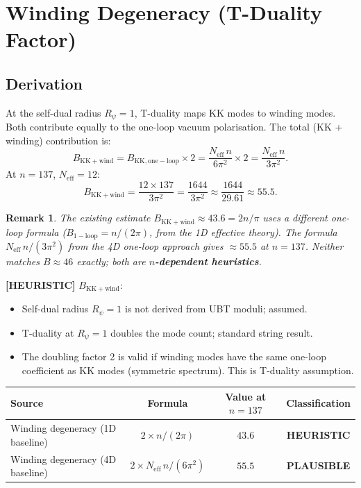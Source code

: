 \documentclass[11pt,a4paper]{article}
\newtheorem{remark}{Remark}
\newcommand{\heuristic}[1]{\textbf{[HEURISTIC]} #1}
\begin{document}
\section{Winding Degeneracy (T-Duality Factor)}

\subsection{Derivation}

At the self-dual radius $R_\psi = 1$, T-duality maps KK modes to winding modes.
Both contribute equally to the one-loop vacuum polarisation.  The total (KK +
winding) contribution is:
\begin{equation}
  B_\mathrm{KK+wind}
  = B_\mathrm{KK,one-loop} \times 2
  = \frac{N_\mathrm{eff}\,n}{6\pi^2} \times 2
  = \frac{N_\mathrm{eff}\,n}{3\pi^2}.
\end{equation}
At $n = 137$, $N_\mathrm{eff} = 12$:
\begin{equation}
  B_\mathrm{KK+wind} = \frac{12 \times 137}{3\pi^2}
  = \frac{1644}{3\pi^2}
  \approx \frac{1644}{29.61}
  \approx 55.5.
\end{equation}

\begin{remark}
The existing estimate $B_\mathrm{KK+wind} \approx 43.6 = 2n/\pi$ uses a \emph{different}
one-loop formula ($B_\mathrm{1-loop} = n/(2\pi)$, from the 1D effective theory).
The formula $N_\mathrm{eff}\,n/(3\pi^2)$ from the 4D one-loop approach gives
$\approx 55.5$ at $n=137$.  Neither matches $B \approx 46$ exactly; both are
\textbf{$n$-dependent heuristics}.
\end{remark}

\heuristic{$B_\mathrm{KK+wind}$:
\begin{itemize}
  \item Self-dual radius $R_\psi = 1$ is not derived from UBT moduli; assumed.
  \item T-duality at $R_\psi = 1$ doubles the mode count; standard string result.
  \item The doubling factor 2 is valid if winding modes have the same one-loop
        coefficient as KK modes (symmetric spectrum). This is T-duality assumption.
\end{itemize}}

\begin{center}
\begin{tabular}{lccc}
\toprule
Source & Formula & Value at $n=137$ & Classification \\\midrule
Winding degeneracy (1D baseline) & $2 \times n/(2\pi)$ & $43.6$ & \textbf{HEURISTIC} \\
Winding degeneracy (4D baseline) & $2 \times N_\mathrm{eff}\,n/(6\pi^2)$ & $55.5$ & \textbf{PLAUSIBLE} \\\bottomrule
\end{tabular}
\end{center}
\end{document}
